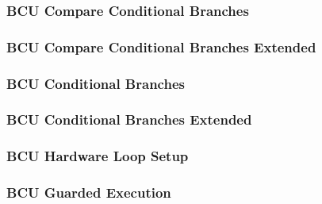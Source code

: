 
\subsubsection[{\small BCU Compare Conditional Branches}]{BCU Compare Conditional Branches} \label{sec:format-BCU-CCB}



\subsubsection[{\small BCU Compare Conditional Branches Extended}]{BCU Compare Conditional Branches Extended} \label{sec:format-BCU-CCB.X}



\subsubsection[{\small BCU Conditional Branches}]{BCU Conditional Branches} \label{sec:format-BCU-CB}



\subsubsection[{\small BCU Conditional Branches Extended}]{BCU Conditional Branches Extended} \label{sec:format-BCU-CB.X}



\subsubsection[{\small BCU Hardware Loop Setup}]{BCU Hardware Loop Setup} \label{sec:format-BCU-HLS}



\subsubsection[{\small BCU Guarded Execution}]{BCU Guarded Execution} \label{sec:format-BCU-GUARD}



